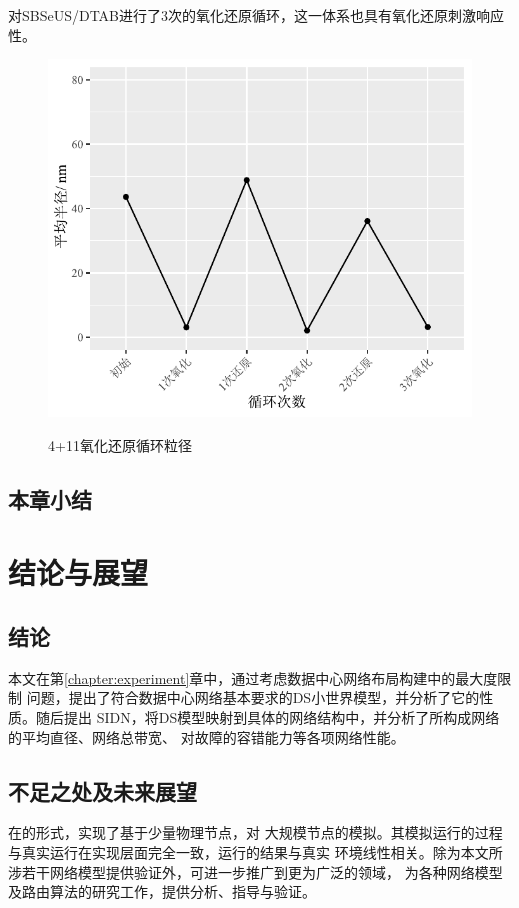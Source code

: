 \documentclass[bachelor,fandolfonts,replaceperiod]{jnuthesis}
\begin{document}
    对SBSeUS/DTAB进行了3次的氧化还原循环，这一体系也具有氧化还原刺激响应性。
    \begin{figure}[htbp]
        \centering
        \includegraphics[width=.6\textwidth]{figure/SBSeUS-redox-circle}\\
        \caption{4+11氧化还原循环粒径}\label{fig:SBSeUS-redox-circle}
    \end{figure}
    
    
    
    \section{本章小结}

    \chapter{结论与展望}\label{chapter:concludes}
    \section{结论}
    本文在第\ref{chapter:experiment}章中，通过考虑数据中心网络布局构建中的最大度限制
    问题，提出了符合数据中心网络基本要求的DS小世界模型，并分析了它的性质。随后提出
    SIDN，将DS模型映射到具体的网络结构中，并分析了所构成网络的平均直径、网络总带宽、
    对故障的容错能力等各项网络性能。
    
    \section{不足之处及未来展望}
    在的形式，实现了基于少量物理节点，对
    大规模节点的模拟。其模拟运行的过程与真实运行在实现层面完全一致，运行的结果与真实
    环境线性相关。除为本文所涉若干网络模型提供验证外，可进一步推广到更为广泛的领域，
    为各种网络模型及路由算法的研究工作，提供分析、指导与验证。
    
\end{document}
